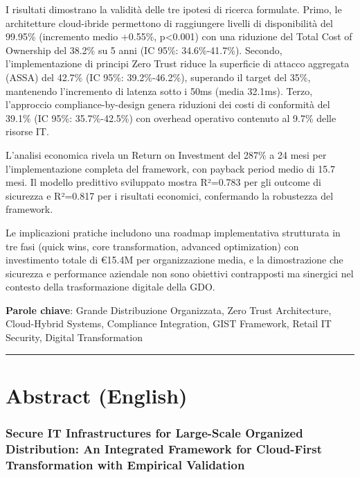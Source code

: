 \documentclass{report}
\begin{document}
I risultati dimostrano la validità delle tre ipotesi di ricerca
formulate. Primo, le architetture cloud-ibride permettono di raggiungere
livelli di disponibilità del 99.95\% (incremento medio +0.55\%,
p\textless0.001) con una riduzione del Total Cost of Ownership del
38.2\% su 5 anni (IC 95\%: 34.6\%-41.7\%). Secondo, l'implementazione di
principi Zero Trust riduce la superficie di attacco aggregata (ASSA) del
42.7\% (IC 95\%: 39.2\%-46.2\%), superando il target del 35\%,
mantenendo l'incremento di latenza sotto i 50ms (media 32.1ms). Terzo,
l'approccio compliance-by-design genera riduzioni dei costi di
conformità del 39.1\% (IC 95\%: 35.7\%-42.5\%) con overhead operativo
contenuto al 9.7\% delle risorse IT.

L'analisi economica rivela un Return on Investment del 287\% a 24 mesi
per l'implementazione completa del framework, con payback period medio
di 15.7 mesi. Il modello predittivo sviluppato mostra R²=0.783 per gli
outcome di sicurezza e R²=0.817 per i risultati economici, confermando
la robustezza del framework.

Le implicazioni pratiche includono una roadmap implementativa
strutturata in tre fasi (quick wins, core transformation, advanced
optimization) con investimento totale di €15.4M per organizzazione
media, e la dimostrazione che sicurezza e performance aziendale non sono
obiettivi contrapposti ma sinergici nel contesto della trasformazione
digitale della GDO.

\textbf{Parole chiave}: Grande Distribuzione Organizzata, Zero Trust
Architecture, Cloud-Hybrid Systems, Compliance Integration, GIST
Framework, Retail IT Security, Digital Transformation

\begin{center}\rule{0.5\linewidth}{0.5pt}\end{center}

\section{Abstract (English)}\label{abstract-english}

\subsubsection{Secure IT Infrastructures for Large-Scale Organized
Distribution: An Integrated Framework for Cloud-First Transformation
with Empirical
Validation}\label{secure-it-infrastructures-for-large-scale-organized-distribution-an-integrated-framework-for-cloud-first-transformation-with-empirical-validation}
\end{document}
